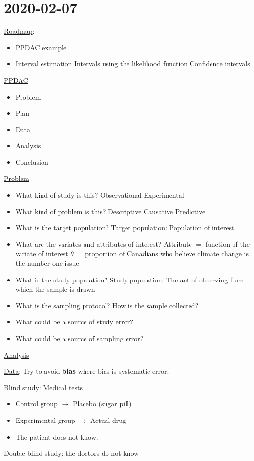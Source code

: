 \section{2020-02-07}
\underline{Roadmap}:
\begin{itemize}
    \item PPDAC example
    \item Interval estimation
          \subitem Intervals using the likelihood function
          \subitem Confidence intervals
\end{itemize}
\underline{PPDAC}
\begin{itemize}
    \item Problem
    \item Plan
    \item Data
    \item Analysis
    \item Conclusion
\end{itemize}
\underline{Problem}
\begin{itemize}
    \item What kind of study is this?
          \subitem Observational
          \subitem Experimental
    \item What kind of problem is this?
          \subitem Descriptive
          \subitem Causative
          \subitem Predictive
    \item What is the target population?
          \subitem Target population: Population of interest
    \item What are the variates and attributes of interest?
          \subitem Attribute $ = $ function of the variate of interest
          \subitem $ \theta= $ proportion of Canadians who believe climate change is the number one issue
    \item What is the study population?
          \subitem Study population: The act of observing from which the sample is drawn
    \item What is the sampling protocol?
          \subitem How is the sample collected?
    \item What could be a source of study error?
    \item What could be a source of sampling error?
\end{itemize}
\underline{Analysis}

\underline{Data}: Try to avoid \textbf{bias} where bias is systematic error.

Blind study: \underline{Medical tests}
\begin{itemize}
    \item Control group $ \rightarrow $ Placebo (sugar pill)
    \item Experimental group $ \rightarrow $ Actual drug
    \item The patient does not know.
\end{itemize}
Double blind study: the doctors do not know

